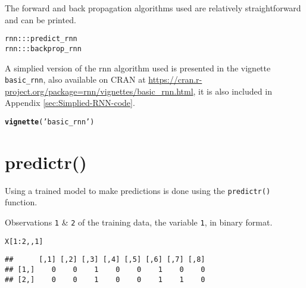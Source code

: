 \documentclass[english,article]{article}\usepackage[]{graphicx}\usepackage[]{color}
\makeatletter
\newcommand{\hlnum}[1]{\textcolor[rgb]{0.686,0.059,0.569}{#1}}%
\newcommand{\hlstr}[1]{\textcolor[rgb]{0.192,0.494,0.8}{#1}}%
\newcommand{\hlopt}[1]{\textcolor[rgb]{0,0,0}{#1}}%
\newcommand{\hlstd}[1]{\textcolor[rgb]{0.345,0.345,0.345}{#1}}%
\newcommand{\hlkwd}[1]{\textcolor[rgb]{0.737,0.353,0.396}{\textbf{#1}}}%
\newenvironment{kframe}{%
 \def\at@end@of@kframe{}%
 \ifinner\ifhmode%
  \def\at@end@of@kframe{\end{minipage}}%
  \begin{minipage}{\columnwidth}%
 \fi\fi%
 \def\FrameCommand##1{\hskip\@totalleftmargin \hskip-\fboxsep
 \colorbox{shadecolor}{##1}\hskip-\fboxsep
     \hskip-\linewidth \hskip-\@totalleftmargin \hskip\columnwidth}%
 \MakeFramed {\advance\hsize-\width
   \@totalleftmargin\z@ \linewidth\hsize
   \@setminipage}}%
 {\par\unskip\endMakeFramed%
 \at@end@of@kframe}
\newenvironment{knitrout}{}{} %
\providecommand*{\code}[1]{\texttt{#1}}
\makeatother
\begin{document}
The forward and back propagation algorithms used are relatively straightforward
and can be printed.

\begin{knitrout}
\color{fgcolor}\begin{kframe}
\begin{alltt}
\hlstd{rnn}\hlopt{:::}\hlstd{predict_rnn}
\hlstd{rnn}\hlopt{:::}\hlstd{backprop_rnn}
\end{alltt}
\end{kframe}
\end{knitrout}

A simplied version of the rnn algorithm used is presented in the vignette
\code{basic\_rnn}, also available on CRAN at \href{https://cran.r-project.org/package\%3Drnn/vignettes/basic_rnn.html}{https://cran.r-project.org/package=rnn/vignettes/basic\_rnn.html},
it is also included in Appendix \ref{sec:Simplied-RNN-code}.

\begin{knitrout}
\color{fgcolor}\begin{kframe}
\begin{alltt}
\hlkwd{vignette}\hlstd{(}\hlstr{'basic_rnn'}\hlstd{)}
\end{alltt}
\end{kframe}
\end{knitrout}


\section{predictr()}

Using a trained model to make predictions is done using the \code{predictr()}
function.

Observations \code{1} \& \code{2} of the training data, the variable
\code{1}, in binary format.

\begin{knitrout}
\color{fgcolor}\begin{kframe}
\begin{alltt}
\hlstd{X[}\hlnum{1}\hlopt{:}\hlnum{2}\hlstd{,,}\hlnum{1}\hlstd{]}
\end{alltt}
\begin{verbatim}
##      [,1] [,2] [,3] [,4] [,5] [,6] [,7] [,8]
## [1,]    0    0    1    0    0    1    0    0
## [2,]    0    0    1    0    0    1    1    0
\end{verbatim}
\end{kframe}
\end{knitrout}
\end{document}
